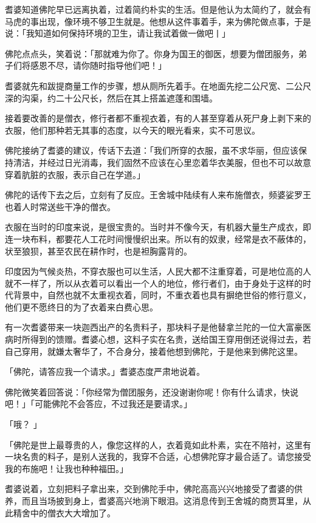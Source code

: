 \documentclass[twoside,openany]{book}
\begin{document}
耆婆知道佛陀早已远离执着，过着简约朴实的生活。但是他认为太简约了，就会有马虎的事出现，像环境不够卫生就是。他想从这件事着手，来为佛陀做点事，于是说：「我知道如何保持环境的卫生，请让我试着做一做吧丨」

佛陀点点头，笑着说：「那就难为你了。你身为国王的御医，想要为僧团服务，弟子们将感恩不尽，请你随时指导他们吧！」

耆婆就先和跋提商量工作的步骤，想从厕所先着手。在地面先挖二公尺宽、二公尺深的沟渠，约二十公尺长，然后在其上搭盖遮蓬和围墙。

接着要改善的是僧衣，修行者都不重视衣着，有的人甚至穿着从死尸身上剥下来的衣服，他们那种若无其事的态度，以今天的眼光看来，实不可思议。

佛陀接纳了耆婆的建议，传话下去道：「我们所穿的衣服，虽不求华丽，但应该保持清洁，并经过日光消毒，我们固然不应该在心里恋着华衣美服，但也不可以故意穿着肮脏的衣服，表示自己在学道。」

佛陀的话传下去之后，立刻有了反应。王舍城中陆续有人来布施僧衣，频婆娑罗王也着人时常送些干净的僧衣。

衣服在当时的印度来说，是很宝贵的。当时并不像今天，有机器大量生产成衣，即连一块布料，都要花人工花时间慢慢织出来。所以有的奴隶，经常是衣不蔽体的，状至狼狈，甚至农民在耕作时，也是袒胸露背的。

印度因为气候炎热，不穿衣服也可以生活，人民大都不注重穿着，可是地位高的人就不一样了，所以从衣着可以看出一个人的地位，修行者们，由于身处于这样的时代背景中，自然也就不太重视衣着，同时，不重衣着也具有摒绝世俗的修行意义，他们更不愿终日的为了衣着来白费心思。

有一次耆婆带来一块迦西出产的名贵料子，那块料子是他替拿兰陀的一位大富豪医病时所得到的馈赠。耆婆心想，这料子实在名贵，送给国王穿用倒还说得过去，若自己穿用，就嫌太奢华了，不合身分，接着他想到佛陀，于是他来到佛陀这里。

「佛陀，请答应我一个请求。」耆婆态度严肃地说着。

佛陀微笑着回答说：「你经常为僧团服务，还没谢谢你呢！你有什么请求，快说吧！」「可能佛陀不会答应，不过我还是要请求。」

「哦？	」

「佛陀是世上最尊贵的人，像您这样的人，衣着竟如此朴素，实在不陪衬，这里有一块名贵的料子，是别人送我的，我穿不合适，心想佛陀穿才最合适了。请您接受我的布施吧！让我也种种福田。」

耆婆说着，立刻把料子拿出来，交到佛陀手中，佛陀高高兴兴地接受了耆婆的供养，而且当场披到身上，耆婆高兴地淌下眼泪。这消息传到王舍城的商贾耳里，从此精舍中的僧衣大大增加了。
\end{document}
